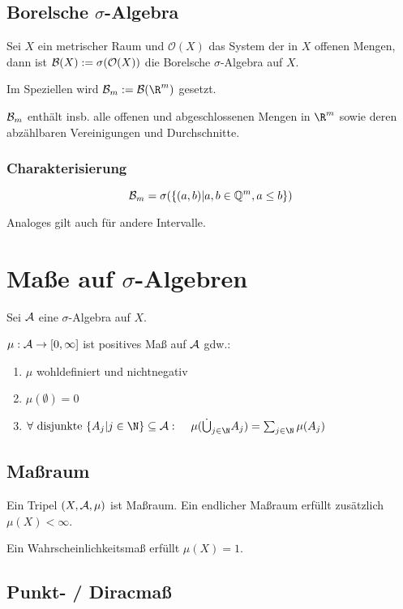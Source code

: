 \subsection*{Borelsche $\sigma$-Algebra}

Sei $X$ ein metrischer Raum und $\mathcal{O}(X)$ das System der in $X$ offenen Mengen, dann ist $\mathcal{B}(X) := \sigma(\mathcal{O}(X))$ die Borelsche $\sigma$-Algebra auf $X$.

Im Speziellen wird $\B_m := \B(\R^m)$ gesetzt.

$\mathcal{B}_m$ enthält insb. alle offenen und abgeschlossenen Mengen in $\R^m$ sowie deren abzählbaren Vereinigungen und Durchschnitte.

\subsubsection*{Charakterisierung}

$$\mathcal{B}_m = \sigma(\{(a, b) | a, b \in \mathbb{Q}^m, a \leq b\})$$

Analoges gilt auch für andere Intervalle.

\section*{Maße auf $\sigma$-Algebren}

Sei $\mathcal{A}$ eine $\sigma$-Algebra auf $X$.

$\mu : \mathcal{A} \to [0, \infty]$ ist positives Maß auf $\mathcal{A}$ gdw.:

\begin{enumerate}[label=(\alph*)]
	\item $\mu$ wohldefiniert und nichtnegativ
	\item $\mu(\emptyset) = 0$
	\item $\forall \text{ disjunkte } \{A_j | j \in \N\} \subseteq \A :\\ \hspace*{4mm} \mu(\dot\bigcup_{j\in \N} A_j) = \sum_{j\in \N} \mu(A_j)$
\end{enumerate}

\subsection*{Maßraum}

Ein Tripel $(X, \mathcal{A}, \mu)$ ist Maßraum. Ein endlicher Maßraum erfüllt zusätzlich $\mu(X) < \infty$.

Ein Wahrscheinlichkeitsmaß erfüllt $\mu(X) = 1$.

\subsection*{Punkt- / Diracmaß}

